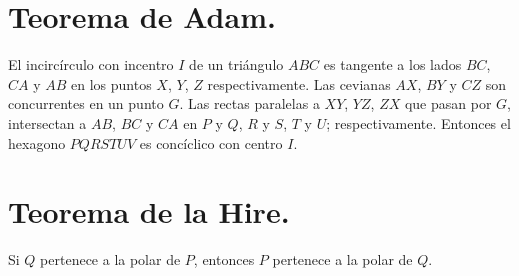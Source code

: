 \documentclass[12pt,a4paper]{book}
\begin{document}
\section{Teorema de Adam.}
El incircírculo con incentro $I$ de un triángulo $ABC$ es tangente a los lados $BC$, $CA$ y $AB$ en los puntos $X$, $Y$, $Z$ respectivamente. Las cevianas  $AX$, $BY$ y $CZ$ son concurrentes en un punto $G.$ Las rectas paralelas a $XY$, $YZ$, $ZX$ que pasan por $G$, intersectan a $AB$, $BC$ y $CA$ en $P$ y $Q$, $R$ y $S$, $T$ y $U$; respectivamente. Entonces el hexagono $PQRSTUV$ es concíclico con centro $I$.
\section{Teorema de la Hire.}
Si $Q$ pertenece a la polar de $P$, entonces $P$ pertenece a la polar de $Q$.
\end{document}
